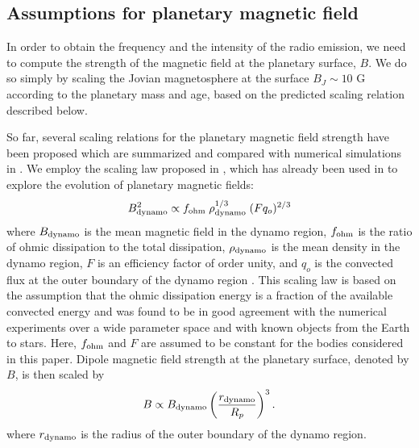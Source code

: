 \documentclass[iop,numberedappendix,apj,twocolappendix,]{emulateapj}
\begin{document}
\subsection{Assumptions for planetary magnetic field}
\label{ss:magneticfield}

In order to obtain the frequency and the intensity of the radio emission, we need to compute the strength of the magnetic field at the planetary surface, $B$. 
We do so simply by scaling the Jovian magnetosphere at the surface $B_J \sim 10$ G according to the planetary mass and age, based on the predicted scaling relation described below. 

So far, several scaling relations for the planetary magnetic field strength  
have been proposed \citep[e.g.][]{russel1978,busse1976,stevenson1979,mizutani1992,sano1993,starchenko2002,christensen2006,christensen_et_al2009}  
which are summarized and compared with numerical simulations in \citet{christensen2010}. 
We employ the scaling law proposed in \citet{christensen_et_al2009}, which has already been used in \citet{reiners2010} to explore the evolution of planetary magnetic fields:
\begin{equation}
B_{\rm dynamo} ^2 \propto f_{\rm ohm}\;\rho_{\rm dynamo}^{1/3} \;  (Fq_o)^{2/3} \label{eq:Bscaling} 
\end{equation}
where $B_{\rm dynamo}$ is the mean magnetic field in the dynamo region, $f_{\rm ohm}$ is the ratio of ohmic dissipation to the total dissipation, $\rho_{\rm dynamo} $ is the mean density in the dynamo region, $F$ is an efficiency factor of order unity, and $q_o$ is the convected flux at the outer boundary of the dynamo region \citep[see][for the comprehensive description]{christensen_et_al2009}. 
This scaling law is based on the assumption that the ohmic dissipation energy is a fraction of the available convected energy and was found to be in good agreement with the numerical experiments over a wide parameter space and with known objects from the Earth to stars. 
Here, $f_{\rm ohm}$ and $F$ are assumed to be constant for the bodies considered in this paper. 
Dipole magnetic field strength at the planetary surface, denoted by $B$, is then scaled by
\begin{equation}
B \propto B_{\rm dynamo} \left( \frac{r_{\rm dynamo}}{R_p} \right)^3.  \label{eq:Bscaling2}
\end{equation}
where $r_{\rm dynamo}$ is the radius of the outer boundary of the dynamo region. 
\end{document}
